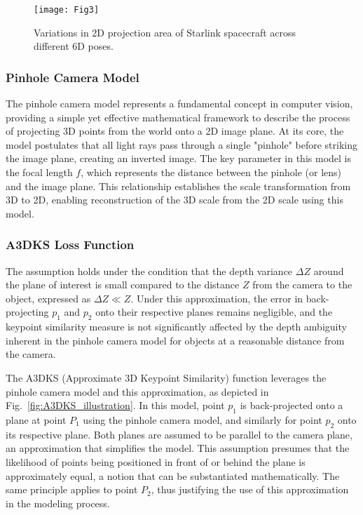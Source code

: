 \documentclass[a4paper,fleqn]{cas-sc}
\begin{document}
\begin{figure}[!htbp]
	\centering
	\texttt{[image: Fig3]} 
	\caption{Variations in 2D projection area of Starlink spacecraft across different 6D poses.}
	\label{fig:Obj_Proj1}
\end{figure}

\subsubsection{Pinhole Camera Model}
The pinhole camera model represents a fundamental concept in computer vision, providing a simple yet effective mathematical framework to describe the process of projecting 3D points from the world onto a 2D image plane. At its core, the model postulates that all light rays pass through a single "pinhole" before striking the image plane, creating an inverted image. The key parameter in this model is the focal length $f$, which represents the distance between the pinhole (or lens) and the image plane. This relationship establishes the scale transformation from 3D to 2D, enabling reconstruction of the 3D scale from the 2D scale using this model.

\subsubsection{A3DKS Loss Function}
The assumption holds under the condition that the depth variance $\Delta Z$ around the plane of interest is small compared to the distance $Z$ from the camera to the object, expressed as $\Delta Z \ll Z$. Under this approximation, the error in back-projecting $p_1$ and $p_2$ onto their respective planes remains negligible, and the keypoint similarity measure is not significantly affected by the depth ambiguity inherent in the pinhole camera model for objects at a reasonable distance from the camera.

The A3DKS (Approximate 3D Keypoint Similarity) function leverages the pinhole camera model and this approximation, as depicted in Fig.~\ref{fig:A3DKS_illustration}. In this model, point $p_1$ is back-projected onto a plane at point $P_1$ using the pinhole camera model, and similarly for point $p_2$ onto its respective plane. Both planes are assumed to be parallel to the camera plane, an approximation that simplifies the model. This assumption presumes that the likelihood of points being positioned in front of or behind the plane is approximately equal, a notion that can be substantiated mathematically. The same principle applies to point $P_2$, thus justifying the use of this approximation in the modeling process.
\end{document}
